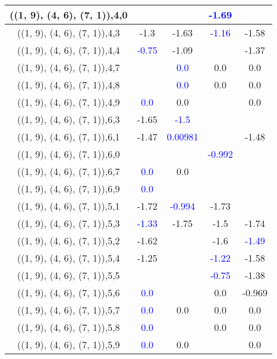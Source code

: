 \documentclass{article}
\begin{document}
\begin{center}
\begin{longtable}{|c|c|c|c|c|}
        	\hline
        	((1, 9), (4, 6), (7, 1)),4,0&&& \textcolor{blue}{-1.69}&\\
        	\hline
        	((1, 9), (4, 6), (7, 1)),4,3&-1.3&-1.63& \textcolor{blue}{-1.16}&-1.58\\
        	\hline
        	((1, 9), (4, 6), (7, 1)),4,4& \textcolor{blue}{-0.75}&-1.09&&-1.37\\
        	\hline
        	((1, 9), (4, 6), (7, 1)),4,7&& \textcolor{blue}{0.0}&0.0&0.0\\
        	\hline
        	((1, 9), (4, 6), (7, 1)),4,8&& \textcolor{blue}{0.0}&0.0&0.0\\
        	\hline
        	((1, 9), (4, 6), (7, 1)),4,9& \textcolor{blue}{0.0}&0.0&&0.0\\
        	\hline
        	((1, 9), (4, 6), (7, 1)),6,3&-1.65& \textcolor{blue}{-1.5}&&\\
        	\hline
        	((1, 9), (4, 6), (7, 1)),6,1&-1.47& \textcolor{blue}{0.00981}&&-1.48\\
        	\hline
        	((1, 9), (4, 6), (7, 1)),6,0&&& \textcolor{blue}{-0.992}&\\
        	\hline
        	((1, 9), (4, 6), (7, 1)),6,7& \textcolor{blue}{0.0}&0.0&&\\
        	\hline
        	((1, 9), (4, 6), (7, 1)),6,9& \textcolor{blue}{0.0}&&&\\
        	\hline
        	((1, 9), (4, 6), (7, 1)),5,1&-1.72& \textcolor{blue}{-0.994}&-1.73&\\
        	\hline
        	((1, 9), (4, 6), (7, 1)),5,3& \textcolor{blue}{-1.33}&-1.75&-1.5&-1.74\\
        	\hline
        	((1, 9), (4, 6), (7, 1)),5,2&-1.62&&-1.6& \textcolor{blue}{-1.49}\\
        	\hline
        	((1, 9), (4, 6), (7, 1)),5,4&-1.25&& \textcolor{blue}{-1.22}&-1.58\\
        	\hline
        	((1, 9), (4, 6), (7, 1)),5,5&&& \textcolor{blue}{-0.75}&-1.38\\
        	\hline
        	((1, 9), (4, 6), (7, 1)),5,6& \textcolor{blue}{0.0}&&0.0&-0.969\\
        	\hline
        	((1, 9), (4, 6), (7, 1)),5,7& \textcolor{blue}{0.0}&0.0&0.0&0.0\\
        	\hline
        	((1, 9), (4, 6), (7, 1)),5,8& \textcolor{blue}{0.0}&&0.0&0.0\\
        	\hline
        	((1, 9), (4, 6), (7, 1)),5,9& \textcolor{blue}{0.0}&0.0&&0.0\\

\end{longtable}
\end{center}
\end{document}
